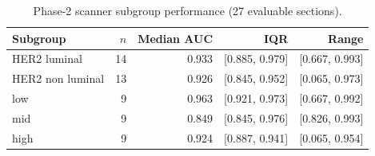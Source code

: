 \begin{table}[h]\centering\footnotesize
\caption{Phase-2 scanner subgroup performance (27 evaluable sections).}\label{tab:scannersub}
\begin{tabular}{lrrrr}
\toprule Subgroup & $n$ & Median AUC & IQR & Range \\
\midrule
HER2 luminal & 14 & 0.933 & [0.885, 0.979] & [0.667, 0.993] \\
HER2 non luminal & 13 & 0.926 & [0.845, 0.952] & [0.065, 0.973] \\
\midrule
low & 9 & 0.963 & [0.921, 0.973] & [0.667, 0.992] \\
mid & 9 & 0.849 & [0.845, 0.976] & [0.826, 0.993] \\
high & 9 & 0.924 & [0.887, 0.941] & [0.065, 0.954] \\
\bottomrule
\end{tabular}
\end{table}
